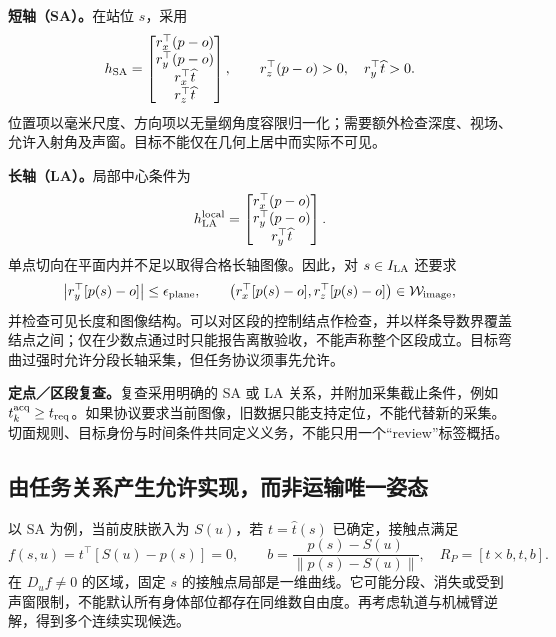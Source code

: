 \documentclass[UTF8,11pt,a4paper,fontset=fandol]{ctexart}
\numberwithin{equation}{section}
\theoremstyle{definition}
\begin{document}
\textbf{短轴（SA）。}在站位 $s$，采用
\begin{equation}
h_{\rm SA}=\begin{bmatrix}
r_x^\top(p-o)\\ r_y^\top(p-o)\\
r_x^\top\widehat t\\ r_z^\top\widehat t
\end{bmatrix},\qquad
r_z^\top(p-o)>0,\quad r_y^\top\widehat t>0.
\label{eq:sa}
\end{equation}
位置项以毫米尺度、方向项以无量纲角度容限归一化；需要额外检查深度、视场、允许入射角及声窗。目标不能仅在几何上居中而实际不可见。

\textbf{长轴（LA）。}局部中心条件为
\begin{equation}
h_{\rm LA}^{\rm local}=\begin{bmatrix}
r_x^\top(p-o)\\r_y^\top(p-o)\\r_y^\top\widehat t
\end{bmatrix}.
\label{eq:la}
\end{equation}
单点切向在平面内并不足以取得合格长轴图像。因此，对 $s\in I_{\rm LA}$ 还要求
\begin{equation}
\left|r_y^\top[p(s)-o]\right|\le\epsilon_{\rm plane},\qquad
\bigl(r_x^\top[p(s)-o],r_z^\top[p(s)-o]\bigr)\in\mathcal W_{\rm image},
\label{eq:lainterval}
\end{equation}
并检查可见长度和图像结构。可以对区段的控制结点作检查，并以样条导数界覆盖结点之间；仅在少数点通过时只能报告离散验收，不能声称整个区段成立。目标弯曲过强时允许分段长轴采集，但任务协议须事先允许。

\textbf{定点／区段复查。}复查采用明确的 SA 或 LA 关系，并附加采集截止条件，例如 $t_k^{\rm acq}\ge t_{\rm req}$。如果协议要求当前图像，旧数据只能支持定位，不能代替新的采集。切面规则、目标身份与时间条件共同定义义务，不能只用一个“review”标签概括。

\subsection{由任务关系产生允许实现，而非运输唯一姿态}
以 SA 为例，当前皮肤嵌入为 $S(u)$，若 $t=\widehat t(s)$ 已确定，接触点满足
\begin{equation}
f(s,u)=t^\top[S(u)-p(s)]=0,\qquad
b=\frac{p(s)-S(u)}{\|p(s)-S(u)\|},\quad
R_P=[t\times b,t,b].
\label{eq:viewfamily}
\end{equation}
在 $D_uf\ne0$ 的区域，固定 $s$ 的接触点局部是一维曲线。它可能分段、消失或受到声窗限制，不能默认所有身体部位都存在同维数自由度。再考虑轨道与机械臂逆解，得到多个连续实现候选。
\end{document}
